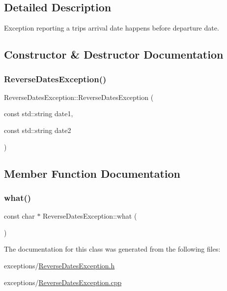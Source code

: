 \subsection{Detailed Description}
Exception reporting a trip\textquotesingle{}s arrival date happens before departure date. 

\subsection{Constructor \& Destructor Documentation}
\mbox{\label{classReverseDatesException_afc245532384383f8f62b20358326c773}} 
\subsubsection{\texorpdfstring{Reverse\+Dates\+Exception()}{ReverseDatesException()}}
{\footnotesize\ttfamily Reverse\+Dates\+Exception\+::\+Reverse\+Dates\+Exception (\begin{DoxyParamCaption}\item[{const std\+::string}]{date1,  }\item[{const std\+::string}]{date2 }\end{DoxyParamCaption})}



\subsection{Member Function Documentation}
\mbox{\label{classReverseDatesException_a52bb69fd0d940befffd9d69855ed6ae8}} 
\subsubsection{\texorpdfstring{what()}{what()}}
{\footnotesize\ttfamily const char $\ast$ Reverse\+Dates\+Exception\+::what (\begin{DoxyParamCaption}{ }\end{DoxyParamCaption})}



The documentation for this class was generated from the following files\+:\begin{DoxyCompactItemize}
\item 
exceptions/\mbox{\hyperlink{ReverseDatesException_8h}{Reverse\+Dates\+Exception.\+h}}\item 
exceptions/\mbox{\hyperlink{ReverseDatesException_8cpp}{Reverse\+Dates\+Exception.\+cpp}}\end{DoxyCompactItemize}
